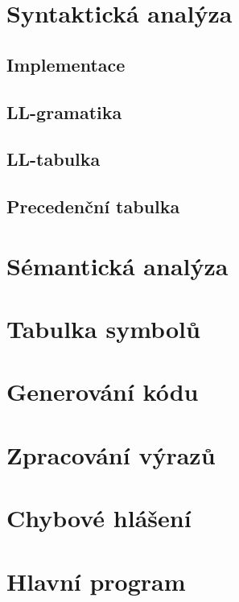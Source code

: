\documentclass[11pt,a4paper]{article}
\begin{document}
    \pagebreak{}
    
    \section{Syntaktická analýza}
    
    \subsection{Implementace}

    \subsection{LL-gramatika}

    \subsection{LL-tabulka}

    \subsection{Precedenční tabulka}


    \section{Sémantická analýza}


    \section{Tabulka symbolů}


    \section{Generování kódu}


    \section{Zpracování výrazů}


    \section{Chybové hlášení}


    \section{Hlavní program}
\end{document}
